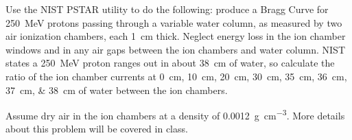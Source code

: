 \documentclass{hw}
\begin{document}
\problem{}
Use the NIST PSTAR utility to do the following: produce a Bragg Curve for \SI{250}{\mega\electronvolt} protons passing through a variable water column, as measured by two air ionization chambers, each \SI{1}{\centi\meter} thick. Neglect energy loss in the ion chamber windows and in any air gaps between the ion chambers and water column. NIST states a \SI{250}{\mega\electronvolt} proton ranges out in about \SI{38}{\centi\meter} of water, so calculate the ratio of the ion chamber currents at \SIlist{0;10;20;30;35;36;37;38}{\centi\meter} of water between the ion chambers.

Assume dry air in the ion chambers at a density of \SI{0.0012}{\gram\per\centi\meter^3}. More details about this problem will be covered in class.
\solution
\end{document}
